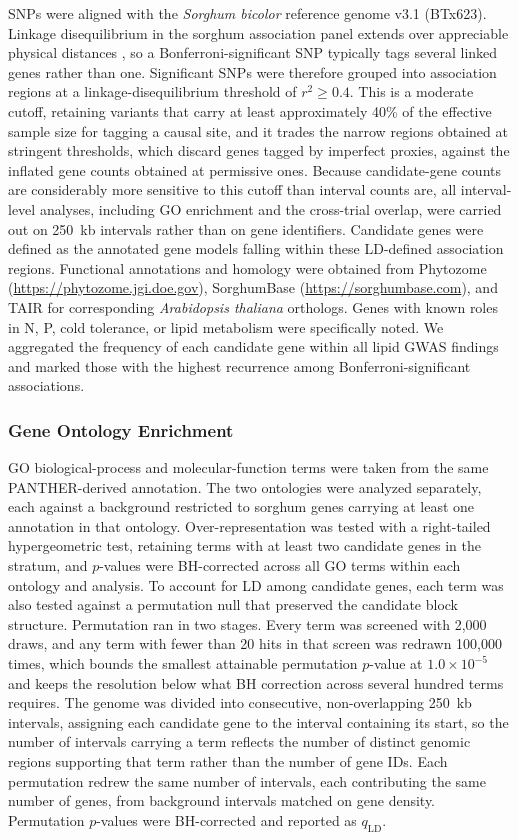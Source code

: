 \documentclass[9pt,twocolumn,twoside]{rilabRxiv}
\begin{document}
SNPs were aligned with the \textit{Sorghum bicolor} reference genome v3.1 (BTx623). Linkage disequilibrium in the sorghum association panel extends over appreciable physical distances \citep{Boatwright2022}, so a Bonferroni-significant SNP typically tags several linked genes rather than one. Significant SNPs were therefore grouped into association regions at a linkage-disequilibrium threshold of $r^2 \geq 0.4$. This is a moderate cutoff, retaining variants that carry at least approximately 40\% of the effective sample size for tagging a causal site, and it trades the narrow regions obtained at stringent thresholds, which discard genes tagged by imperfect proxies, against the inflated gene counts obtained at permissive ones. Because candidate-gene counts are considerably more sensitive to this cutoff than interval counts are, all interval-level analyses, including GO enrichment and the cross-trial overlap, were carried out on 250~kb intervals rather than on gene identifiers. Candidate genes were defined as the annotated gene models falling within these LD-defined association regions. Functional annotations and homology were obtained from Phytozome (\url{https://phytozome.jgi.doe.gov}), SorghumBase (\url{https://sorghumbase.com}), and TAIR for corresponding \textit{Arabidopsis thaliana} orthologs. Genes with known roles in N, P, cold tolerance, or lipid metabolism were specifically noted. We aggregated the frequency of each candidate gene within all lipid GWAS findings and marked those with the highest recurrence among Bonferroni-significant associations.

\subsubsection*{Gene Ontology Enrichment}

GO biological-process and molecular-function terms were taken from the same PANTHER-derived annotation. The two ontologies were analyzed separately, each against a background restricted to sorghum genes carrying at least one annotation in that ontology. Over-representation was tested with a right-tailed hypergeometric test, retaining terms with at least two candidate genes in the stratum, and $p$-values were BH-corrected across all GO terms within each ontology and analysis. To account for LD among candidate genes, each term was also tested against a permutation null that preserved the candidate block structure. Permutation ran in two stages. Every term was screened with 2,000 draws, and any term with fewer than 20 hits in that screen was redrawn 100,000 times, which bounds the smallest attainable permutation $p$-value at $1.0\times10^{-5}$ and keeps the resolution below what BH correction across several hundred terms requires. The genome was divided into consecutive, non-overlapping 250~kb intervals, assigning each candidate gene to the interval containing its start, so the number of intervals carrying a term reflects the number of distinct genomic regions supporting that term rather than the number of gene IDs. Each permutation redrew the same number of intervals, each contributing the same number of genes, from background intervals matched on gene density. Permutation $p$-values were BH-corrected and reported as $q_{\mathrm{LD}}$.
\end{document}
